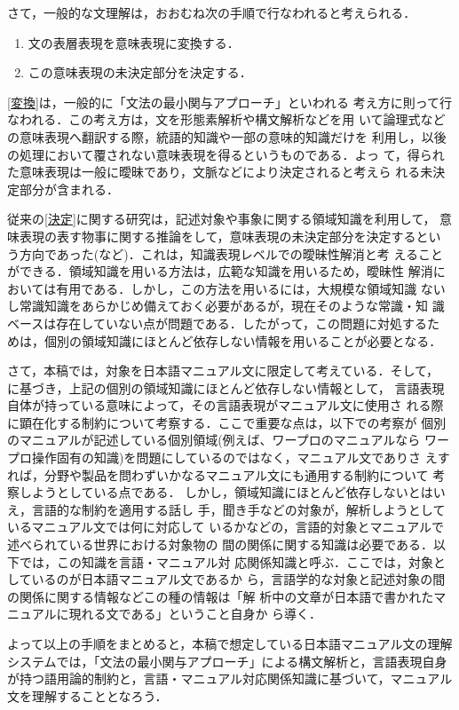 さて，一般的な文理解は，おおむね次の手順で行なわれると考えられる．
\begin{enumerate}
\item 文の表層表現を意味表現に変換する．\label{変換}
\item この意味表現の未決定部分を決定する．\label{決定}
\end{enumerate}

\ref{変換}は，一般的に「文法の最小関与アプローチ」\cite{kame}といわれる
考え方に則って行なわれる．この考え方は，文を形態素解析や構文解析などを用
いて論理式などの意味表現へ翻訳する際，統語的知識や一部の意味的知識だけを
利用し，以後の処理において覆されない意味表現を得るというものである．よっ
て，得られた意味表現は一般に曖昧であり，文脈などにより決定されると考えら
れる未決定部分が含まれる．

従来の\ref{決定}に関する研究は，記述対象や事象に関する領域知識を利用して，
意味表現の表す物事に関する推論をして，意味表現の未決定部分を決定するとい
う方向であった(\cite{abe}など)．これは，知識表現レベルでの曖昧性解消と考
えることができる．領域知識を用いる方法は，広範な知識を用いるため，曖昧性
解消においては有用である．しかし，この方法を用いるには，大規模な領域知識
ないし常識知識をあらかじめ備えておく必要があるが，現在そのような常識・知
識ベースは存在していない点が問題である．したがって，この問題に対処するた
めは，個別の領域知識にほとんど依存しない情報を用いることが必要となる．

さて，本稿では，対象を日本語マニュアル文に限定して考えている．そして，
\cite{mori}に基づき，上記の個別の領域知識にほとんど依存しない情報として，
言語表現自体が持っている意味によって，その言語表現がマニュアル文に使用さ
れる際に顕在化する制約について考察する．ここで重要な点は，以下での考察が
個別のマニュアルが記述している個別領域(例えば、ワープロのマニュアルなら
ワープロ操作固有の知識)を問題にしているのではなく，マニュアル文でありさ
えすれば，分野や製品を問わずいかなるマニュアル文にも通用する制約について
考察しようとしている点である．
しかし，領域知識にほとんど依存しないとはいえ，言語的な制約を適用する話し
手，聞き手などの対象が，解析しようとしているマニュアル文では何に対応して
いるかなどの，言語的対象とマニュアルで述べられている世界における対象物の
間の関係に関する知識は必要である．以下では，この知識を言語・マニュアル対
応関係知識と呼ぶ．ここでは，対象としているのが日本語マニュアル文であるか
ら，言語学的な対象と記述対象の間の関係に関する情報などこの種の情報は「解
析中の文章が日本語で書かれたマニュアルに現れる文である」ということ自身か
ら導く．

よって以上の手順をまとめると，本稿で想定している日本語マニュアル文の理解
システムでは，「文法の最小関与アプローチ」による構文解析と，言語表現自身
が持つ語用論的制約と，言語・マニュアル対応関係知識に基づいて，マニュアル
文を理解することとなろう．


